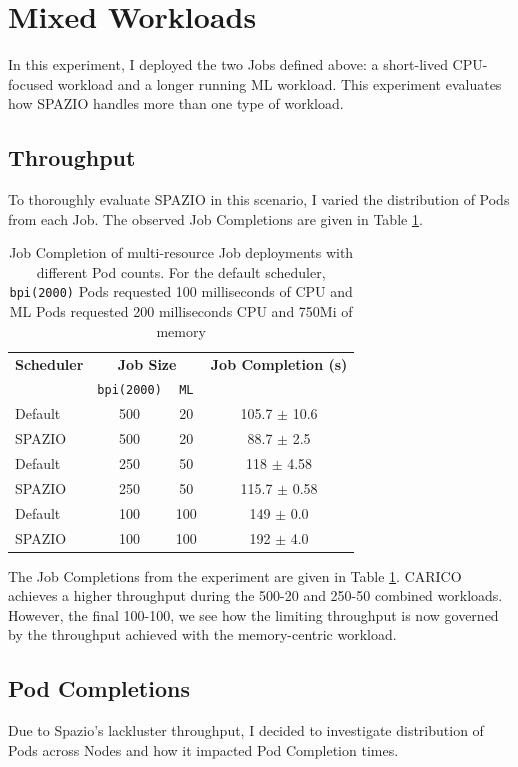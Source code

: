 \section{Mixed Workloads}
\label{sec:eval-mixed}
In this experiment, I deployed the two Jobs defined above: a short-lived
CPU-focused workload and a longer running ML workload. This experiment evaluates
how SPAZIO handles more than one type of workload.

\subsection{Throughput}
To thoroughly evaluate SPAZIO in this scenario, I varied the distribution of
Pods from each Job. The observed Job Completions are given in Table
\ref{tab:mixed-throughput}.

\begin{table}[H]
\centering
    \begin{tabular}{|l|c|c|c|}
    \hline
    \textbf{Scheduler} & \multicolumn{2}{c|}{\textbf{Job Size}} &
        \textbf{Job Completion (s)} \\ \cline{2-3}
        &  \texttt{bpi(2000)} & \texttt{ML} & \\
    \hline
        Default & 500 & 20 & 105.7 $\pm$ 10.6 \\
        SPAZIO & 500 & 20 & 88.7 $\pm$ 2.5 \\
        Default & 250 & 50 & 118 $\pm$ 4.58 \\
        SPAZIO & 250 & 50 & 115.7 $\pm$ 0.58 \\
        Default & 100 & 100 & 149 $\pm$ 0.0 \\
        SPAZIO & 100 & 100 & 192 $\pm$ 4.0 \\
    \hline
    \end{tabular}
    \caption{Job Completion of multi-resource Job deployments with different Pod
    counts. For the default scheduler, \texttt{bpi(2000)} Pods requested 100
    milliseconds of CPU and ML Pods requested 200 milliseconds CPU and 750Mi of
    memory}
    \label{tab:mixed-throughput}
\end{table}
The Job Completions from the experiment are given in Table
\ref{tab:mixed-throughput}. CARICO achieves a higher throughput during the
500-20 and 250-50 combined workloads. However, the final 100-100, we see how the
limiting throughput is now governed by the throughput achieved with the
memory-centric workload.

\subsection{Pod Completions}
Due to Spazio's lackluster throughput, I decided to investigate distribution of
Pods across Nodes and how it impacted Pod Completion times.

